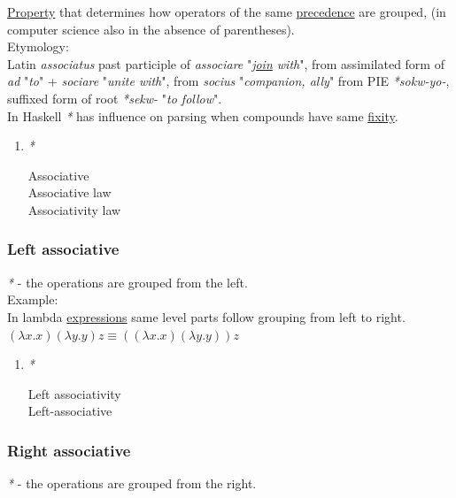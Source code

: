 \documentclass[a4paper,14pt,oneside]{book}
\begin{document}
\hyperref[org217f324]{Property} that determines how operators of the same \hyperref[orgd2e0934]{precedence} are grouped, (in computer science also in the absence of parentheses).\\

Etymology:\\
Latin \emph{associatus} past participle of \emph{associare} "\emph{\hyperref[org9988dd5]{join} with}", from assimilated form of \emph{ad} "\emph{to}" + \emph{sociare} "\emph{unite with}", from \emph{socius} "\emph{companion, ally}" from PIE \emph{*sokw-yo-}, suffixed form of root \emph{*sekw-} "\emph{to follow}".\\

In Haskell \emph{*} has influence on parsing when compounds have same \hyperref[org0856e60]{fixity}.\\

\begin{enumerate}
\item \emph{*}
\label{sec:orgd6c887d}

\label{org9b6c0b8}Associative\\
\label{orgbc95217}Associative law\\
\label{org1e67210}Associativity law\\
\end{enumerate}

\subsubsection{\label{org6ad9dc6}Left associative}
\label{sec:org1474ac9}
\emph{*} - the operations are grouped from the left.\\

Example:\\
In lambda \hyperref[orgf28b2f4]{expressions} same level parts follow grouping from left to right.\\
\((\lambda x . x)(\lambda y . y)z \equiv ((\lambda x . x)(\lambda y . y))z\)\\

\begin{enumerate}
\item \emph{*}
\label{sec:org94a4ad0}

\label{org805820d}Left associativity\\
\label{orgb8a0fdc}Left-associative\\
\end{enumerate}

\subsubsection{\label{org1378032}Right associative}
\label{sec:org8fcf6f5}
\emph{*} - the operations are grouped from the right.\\
\end{document}
